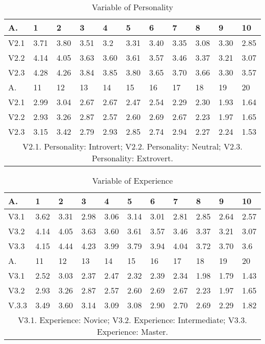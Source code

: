\documentclass[english]{textolivre}
\begin{document}
\begin{table}[htpb]
\caption{Variable of Personality}
\label{figure3}
\centering
\begin{tabular}{lllllllllll}
\toprule
A. & 1 & 2 & 3 & 4 & 5 & 6 & 7 & 8 & 9 & 10
\\ 
\midrule
V2.1 & 3.71 & 3.80 & 3.51 & 3.2 & 3.31 & 3.40 & 3.35 & 3.08 & 3.30 & 2.85
\\
V2.2 & 4.14 & 4.05 & 3.63 & 3.60 & 3.61 & 3.57 & 3.46 & 3.37 & 3.21 & 3.07
\\
V2.3 & 4.28 & 4.26 & 3.84 & 3.85 & 3.80 & 3.65 & 3.70 & 3.66 & 3.30 & 3.57
\\
\midrule
A. & 11 & 12 & 13 & 14 & 15 & 16 & 17 & 18 & 19 & 20
\\
\midrule
V2.1 & 2.99 & 3.04 & 2.67 & 2.67 & 2.47 & 2.54 & 2.29 & 2.30 & 1.93 & 1.64
\\
V2.2 & 2.93 & 3.26 & 2.87 & 2.57 & 2.60 & 2.69 & 2.67 & 2.23 & 1.97 & 1.65
\\
V2.3 & 3.15 & 3.42 & 2.79 & 2.93 & 2.85 & 2.74 & 2.94 & 2.27 & 2.24 & 1.53
\\ 
\midrule
\multicolumn{11}{c}{V2.1. Personality: Introvert; V2.2. Personality: Neutral; V2.3. Personality: Extrovert.}
\\
\bottomrule
\end{tabular}
\centering
\end{table}

\begin{table}[htpb]
\caption{Variable of Experience}
\label{figure4}
\centering
\begin{tabular}{lllllllllll}
\toprule
A. & 1 & 2 & 3 & 4 & 5 & 6 & 7 & 8 & 9 & 10
\\ 
\midrule
V3.1 & 3.62 & 3.31 & 2.98 & 3.06 & 3.14 & 3.01 & 2.81 & 2.85 & 2.64 & 2.57 
\\
V3.2 & 4.14 & 4.05 & 3.63 & 3.60 & 3.61 & 3.57 & 3.46 & 3.37 & 3.21 & 3.07
\\
V3.3 & 4.15 & 4.44 & 4.23 & 3.99 & 3.79 & 3.94 & 4.04 & 3.72 & 3.70 & 3.6
\\
\midrule
A. & 11 & 12 & 13 & 14 & 15 & 16 & 17 & 18 & 19 & 20
\\
\midrule
V3.1 & 2.52 & 3.03 & 2.37 & 2.47 & 2.32 & 2.39 & 2.34 & 1.98 & 1.79 & 1.43
\\
V3.2 & 2.93 & 3.26 & 2.87 & 2.57 & 2.60 & 2.69 & 2.67 & 2.23 & 1.97 & 1.65
\\
V.3.3 & 3.49 & 3.60 & 3.14 & 3.09 & 3.08 & 2.90 & 2.70 & 2.69 & 2.29 & 1.82
\\ 
\midrule
\multicolumn{11}{c}{V3.1. Experience: Novice; V3.2. Experience: Intermediate; V3.3. Experience: Master.}
\\
\bottomrule
\end{tabular}
\end{table}
\end{document}
